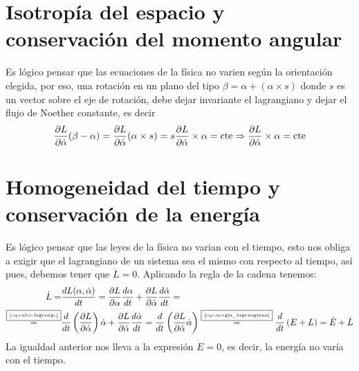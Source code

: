 \section{Isotropía del espacio y conservación del momento angular}
Es lógico pensar que las ecuaciones de la física no varien según la orientación elegida, por eso, una rotación en un plano del tipo $\beta=\alpha + (\alpha\times s)$ donde $s$ es un vector sobre el eje de rotación, debe dejar invariante el lagrangiano y dejar el flujo de Noether constante, es decir
\begin{equation}
	\label{eq:conservacion_momento_angular}
	\frac{\partial L}{\partial\dot{\alpha}}(\beta-\alpha) = \frac{\partial L}{\partial\dot{\alpha}}(\alpha\times s) = s \frac{\partial L}{\partial\dot{\alpha}}\times \alpha=\text{cte}\Rightarrow\frac{\partial L}{\partial\dot{\alpha}}\times \alpha=\text{cte}
\end{equation}

\section{Homogeneidad del tiempo y conservación de la energía}
Es lógico pensar que las leyes de la física no varian con el tiempo, esto nos obliga a exigir que el lagrangiano de un sistema sea el mismo con respecto al tiempo, así pues, debemos tener que $\dot{L}=0$.
Aplicando la regla de la cadena tenemos:
\begin{align*}
	\dot{L}= & \frac{dL(\alpha, \dot{\alpha})}{dt}=\frac{\partial L}{\partial \alpha}\frac{d\alpha}{dt}+\frac{\partial L}{\partial \dot{\alpha}}\frac{d\dot{\alpha}}{dt} = \\
	\overset{\fbox{\tiny \ref{eq:euler-lagrange}}}{=} & \frac{d}{dt}\left(\frac{\partial L}{\partial \dot{\alpha}}\right)\dot{\alpha}+\frac{\partial L}{\partial \dot{\alpha}}\frac{d\dot{\alpha}}{dt}=\frac{d}{dt}\left(\frac{\partial L}{\partial \dot{\alpha}}\dot{\alpha}\right)\overset{\fbox{\tiny \ref{eq:energia_lagrangiana}}}{=}\frac{d}{dt}\left(E+L\right)=\dot{E}+\dot{L}
\end{align*}
La igualdad anterior nos lleva a la expresión $\dot{E}=0$, es decir, la energía no varía con el tiempo.
